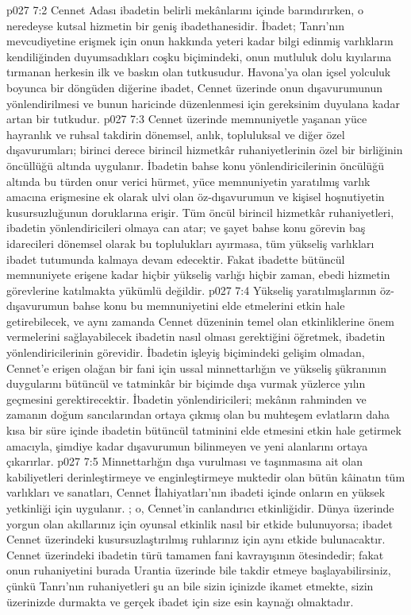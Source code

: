 \vs p027 7:2 Cennet Adası ibadetin belirli mekânlarını içinde barındırırken, o neredeyse kutsal hizmetin bir geniş ibadethanesidir. İbadet; Tanrı’nın mevcudiyetine erişmek için onun hakkında yeteri kadar bilgi edinmiş varlıkların kendiliğinden duyumsadıkları coşku biçimindeki, onun mutluluk dolu kıyılarına tırmanan herkesin ilk ve baskın olan tutkusudur. Havona’ya olan içsel yolculuk boyunca bir döngüden diğerine ibadet, Cennet üzerinde onun dışavurumunun yönlendirilmesi ve bunun haricinde düzenlenmesi için gereksinim duyulana kadar artan bir tutkudur.
\vs p027 7:3 Cennet üzerinde memnuniyetle yaşanan yüce hayranlık ve ruhsal takdirin dönemsel, anlık, topluluksal ve diğer özel dışavurumları; birinci derece birincil hizmetkâr ruhaniyetlerinin özel bir birliğinin öncüllüğü altında uygulanır. İbadetin bahse konu yönlendiricilerinin öncülüğü altında bu türden onur verici hürmet, yüce memnuniyetin yaratılmış varlık amacına erişmesine ek olarak ulvi olan öz\hyp{}dışavurumun ve kişisel hoşnutiyetin kusursuzluğunun doruklarına erişir. Tüm öncül birincil hizmetkâr ruhaniyetleri, ibadetin yönlendiricileri olmaya can atar; ve şayet bahse konu görevin baş idarecileri dönemsel olarak bu toplulukları ayırmasa, tüm yükseliş varlıkları ibadet tutumunda kalmaya devam edecektir. Fakat ibadette bütüncül memnuniyete erişene kadar hiçbir yükseliş varlığı hiçbir zaman, ebedi hizmetin görevlerine katılmakta yükümlü değildir.
\vs p027 7:4 Yükseliş yaratılmışlarının öz\hyp{}dışavurumun bahse konu bu memnuniyetini elde etmelerini etkin hale getirebilecek, ve aynı zamanda Cennet düzeninin temel olan etkinliklerine önem vermelerini sağlayabilecek ibadetin nasıl olması gerektiğini öğretmek, ibadetin yönlendiricilerinin görevidir. İbadetin işleyiş biçimindeki gelişim olmadan, Cennet’e erişen olağan bir fani için ussal minnettarlığın ve yükseliş şükranının duygularını bütüncül ve tatminkâr bir biçimde dışa vurmak yüzlerce yılın geçmesini gerektirecektir. İbadetin yönlendiricileri; mekânın rahminden ve zamanın doğum sancılarından ortaya çıkmış olan bu muhteşem evlatların daha kısa bir süre içinde ibadetin bütüncül tatminini elde etmesini etkin hale getirmek amacıyla, şimdiye kadar dışavurumun bilinmeyen ve yeni alanlarını ortaya çıkarırlar.
\vs p027 7:5 Minnettarlığın dışa vurulması ve taşınmasına ait olan kabiliyetleri derinleştirmeye ve enginleştirmeye muktedir olan bütün kâinatın tüm varlıkları ve sanatları, Cennet İlahiyatları’nın ibadeti içinde onların en yüksek yetkinliği için uygulanır. ; o, Cennet’in canlandırıcı etkinliğidir. Dünya üzerinde yorgun olan akıllarınız için oyunsal etkinlik nasıl bir etkide bulunuyorsa; ibadet Cennet üzerindeki kusursuzlaştırılmış ruhlarınız için aynı etkide bulunacaktır. Cennet üzerindeki ibadetin türü tamamen fani kavrayışının ötesindedir; fakat onun ruhaniyetini burada Urantia üzerinde bile takdir etmeye başlayabilirsiniz, çünkü Tanrı’nın ruhaniyetleri şu an bile sizin içinizde ikamet etmekte, sizin üzerinizde durmakta ve gerçek ibadet için size esin kaynağı olmaktadır.

